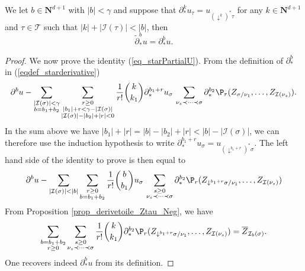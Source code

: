\documentclass[11pt]{preprint}
\newcommand{\mcI}{\mathcal{I}}
\newcommand{\mcT}{\mathcal{T}}
\def\eqref#1{(\ref{#1})}
\newcommand{\bfN}{\mathbf{N}}
\begin{document}
		\begin{lemma}\label{lem_deriv_uk_to_u}
		We let $b\in\bfN^{d+1}$ with $|b|<\gamma$ and suppose that $\partial^k_*u_\tau = u_{(\downarrow^k)^*\tau}$ for any $k\in\bfN^{d+1}$ and $\tau\in\mcT$ such that $|k|+|\mcI(\tau)|< |b|$, then
			$$
			\widetilde\partial^b_{*}u = \partial^b_* u.
			$$
		\end{lemma}
	\begin{proof}
		We now prove the identity \eqref{eq_starPartialU}. From the definition of $\partial^b_*$ in \eqref{eqdef_starderivative}
	\begin{align*}
		\partial^b u - \sum_{\substack{|\mcI(\sigma)|<\gamma \\ b=b_1+b_2}} \sum_{\substack{ r\geq  0 \\ |b_1|+r <\gamma-|\mcI(\sigma)| \\ |\mcI(\sigma)|-|b_2|+|r|<0 }} \frac{1}{r!}\binom{k}{k_1} \partial^{b_1+r}_*u_\sigma \,  \sum_{\nu_s\prec\dots\prec\sigma}\partial^{b_2}_*\P_r(Z_{\sigma/\nu_1},\dots, Z_{\mcI(\nu_s)}). 
	\end{align*}
	In the sum  above we have $|b_1|+|r|= |b|-|b_2|+|r|<|b|-|\mcI(\sigma)|$, we can therefore use the induction hypothesis to write $\partial^{b_1+r}_*u_\sigma = u_{(\downarrow^{b_1+r})^*\sigma}$. The left hand side of the identity to prove is then equal to  
	\begin{align*}
		\partial^b u - \sum_{\substack{ |\mcI(\sigma)|<|b| }} \sum_{\substack{ r\geq  0 \\ b=b_1+b_2 }} \frac{1}{r!}\binom{b}{b_1} u_\sigma \,  \sum_{\substack{s\geq0 \\ \nu_s\prec\dots\prec\sigma}}\partial^{b_2}_*\P_r(Z_{\downarrow^{b_1+r}\sigma/\nu_1},\dots, Z_{\mcI(\nu_s)}) 
	\end{align*}
	From  Proposition \ref{prop_derivetoile_Ztau_Neg}, we have 
	$$
	\sum_{\substack{b=b_1+b_2 \\ r\geq 0}} \sum_{\substack{s\geq0 \\ \nu_s\prec\dots\prec\sigma}} \frac{1}{r!}\binom{k}{k_1} \partial^{b_2}_*\P_r(Z_{\downarrow^{b_1+r}\sigma/\nu_1},\dots, Z_{\mcI(\nu_s)}) = \overline{Z}_{\mcI_b(\sigma)}.
	$$ 
	One recovers indeed $\partial^b_*u$ from its definition.
	\end{proof}
		
\end{document}
